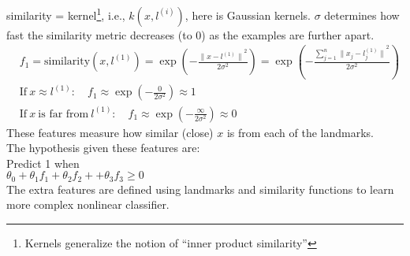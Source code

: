 similarity = kernel\footnote{Kernels generalize the notion of ``inner product similarity''}, i.e., $k(x, l^{(i)})$, here is Gaussian kernels. $\sigma$ determines how fast the similarity metric decreases (to 0) as the examples are further apart.\\
\begin{align}
& f_1 = \text{similarity}(x, l^{(1)})=\exp{\left(-\frac{{\|x-l^{(1)}\|}^2}{2\sigma^2}\right)} = \exp{\left(-\frac{\sum_{j=1}^n{\|x_j-l_j^{(1)}\|}^2}{2\sigma^2}\right)} \\
&\text{If} ~ x \approx l^{(1)}: \quad f_1 \approx \exp{\left(-\frac{0}{2\sigma^2}\right)} \approx 1 \nonumber \\
&\text{If} ~ x ~ \text{is far from} ~ l^{(1)}: \quad f_1 \approx \exp{\left(-\frac{\infty}{2\sigma^2}\right)} \approx 0 \nonumber
\end{align}
These features measure how similar (close) $x$ is from each of the landmarks.\\

The hypothesis given these features are:\\
Predict 1 when\\
$\theta_0 + \theta_1f_1 + \theta_2f_2 + + \theta_3f_3 \geq 0$\\
The extra features are defined using landmarks and similarity functions to learn more complex nonlinear classifier.\\

